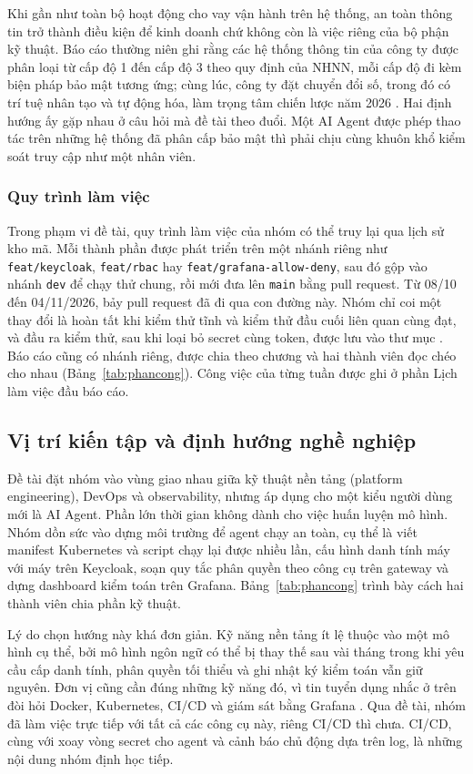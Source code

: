 Khi gần như toàn bộ hoạt động cho vay vận hành trên hệ thống, an toàn thông tin trở thành điều kiện để kinh doanh chứ không còn là việc riêng của bộ phận kỹ thuật. Báo cáo thường niên ghi rằng các hệ thống thông tin của công ty được phân loại từ cấp độ 1 đến cấp độ 3 theo quy định của NHNN, mỗi cấp độ đi kèm biện pháp bảo mật tương ứng; cùng lúc, công ty đặt chuyển đổi số, trong đó có trí tuệ nhân tạo và tự động hóa, làm trọng tâm chiến lược năm 2026 \parencite{vietcredit_bctn2025}. Hai định hướng ấy gặp nhau ở câu hỏi mà đề tài theo đuổi. Một AI Agent được phép thao tác trên những hệ thống đã phân cấp bảo mật thì phải chịu cùng khuôn khổ kiểm soát truy cập như một nhân viên.

\subsubsection{Quy trình làm việc}

Trong phạm vi đề tài, quy trình làm việc của nhóm có thể truy lại qua lịch sử kho mã. Mỗi thành phần được phát triển trên một nhánh riêng như \texttt{feat/keycloak}, \texttt{feat/rbac} hay \texttt{feat/grafana-allow-deny}, sau đó gộp vào nhánh \texttt{dev} để chạy thử chung, rồi mới đưa lên \texttt{main} bằng pull request. Từ 08/10 đến 04/11/2026, bảy pull request đã đi qua con đường này. Nhóm chỉ coi một thay đổi là hoàn tất khi kiểm thử tĩnh và kiểm thử đầu cuối liên quan cùng đạt, và đầu ra kiểm thử, sau khi loại bỏ secret cùng token, được lưu vào thư mục . Báo cáo cũng có nhánh riêng, được chia theo chương và hai thành viên đọc chéo cho nhau (Bảng~\ref{tab:phancong}). Công việc của từng tuần được ghi ở phần Lịch làm việc đầu báo cáo.

\subsection{Vị trí kiến tập và định hướng nghề nghiệp}

Đề tài đặt nhóm vào vùng giao nhau giữa kỹ thuật nền tảng (platform engineering), DevOps và observability, nhưng áp dụng cho một kiểu người dùng mới là AI Agent. Phần lớn thời gian không dành cho việc huấn luyện mô hình. Nhóm dồn sức vào dựng môi trường để agent chạy an toàn, cụ thể là viết manifest Kubernetes và script chạy lại được nhiều lần, cấu hình danh tính máy với máy trên Keycloak, soạn quy tắc phân quyền theo công cụ trên gateway và dựng dashboard kiểm toán trên Grafana. Bảng~\ref{tab:phancong} trình bày cách hai thành viên chia phần kỹ thuật.

Lý do chọn hướng này khá đơn giản. Kỹ năng nền tảng ít lệ thuộc vào một mô hình cụ thể, bởi mô hình ngôn ngữ có thể bị thay thế sau vài tháng trong khi yêu cầu cấp danh tính, phân quyền tối thiểu và ghi nhật ký kiểm toán vẫn giữ nguyên. Đơn vị cũng cần đúng những kỹ năng đó, vì tin tuyển dụng nhắc ở trên đòi hỏi Docker, Kubernetes, CI/CD và giám sát bằng Grafana \parencite{vietcredit_tuyendung_ds}. Qua đề tài, nhóm đã làm việc trực tiếp với tất cả các công cụ này, riêng CI/CD thì chưa. CI/CD, cùng với xoay vòng secret cho agent và cảnh báo chủ động dựa trên log, là những nội dung nhóm định học tiếp.
